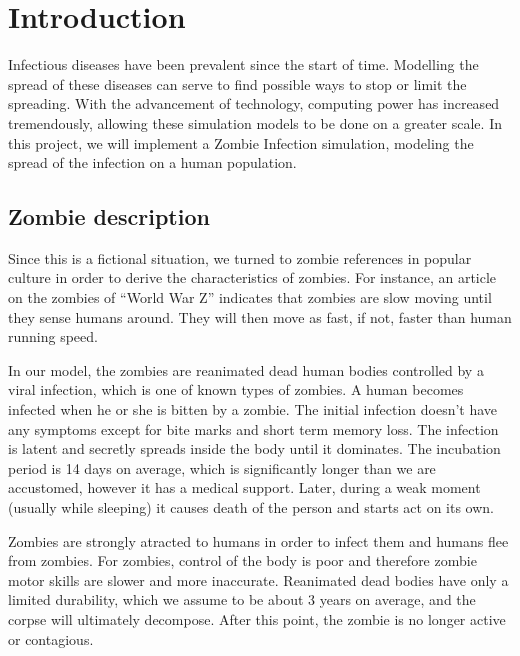 \documentclass[a4paper]{article}
\title{\mytitle}
\author{Adam Juraszek \and Ryan Leong Wei Shiong \and Matthew Signorini \and Ziying Yang}
\begin{document}
\maketitle

\section{Introduction} %

Infectious diseases have been prevalent since the start of time.
Modelling the spread of these diseases can serve to find possible ways to stop or limit the spreading.
With the advancement of technology, computing power has increased tremendously, allowing these simulation models to be done on a greater scale.
In this project, we will implement a Zombie Infection simulation, modeling the spread of the infection on a human population.

\subsection{Zombie description}

Since this is a fictional situation, we turned to zombie references in popular culture in order to derive the characteristics of zombies.
For instance, an article on the zombies of ``World War Z'' indicates that zombies are slow moving until they sense humans around.
They will then move as fast, if not, faster than human running speed. \cite{guidetozombies}

In our model, the zombies are reanimated dead human bodies controlled by a viral infection, which is one of known types of zombies. \cite{survivingthedead}
A human becomes infected when he or she is bitten by a zombie.
The initial infection doesn't have any symptoms except for bite marks and short term memory loss.
The infection is latent and secretly spreads inside the body until it dominates.
The incubation period is 14 days on average, which is significantly longer than we are accustomed, however it has a medical support. \cite{mogk2011everything}
Later, during a weak moment (usually while sleeping) it causes death of the person and starts act on its own.

Zombies are strongly atracted to humans in order to infect them and humans flee from zombies.
For zombies, control of the body is poor and therefore zombie motor skills are slower and more inaccurate.
Reanimated dead bodies have only a limited durability, which we assume to be about 3 years on average\cite{zombiepedia}, and the corpse will ultimately decompose. After this point, the zombie is no longer active or contagious.
\end{document}

